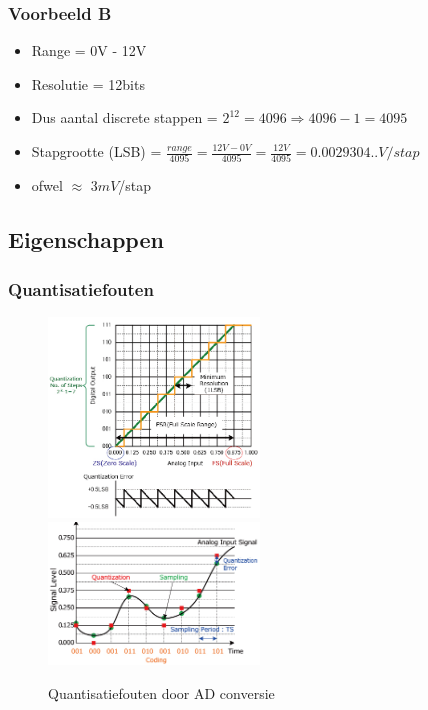 \documentclass{article}
\begin{document}
\subsubsection{Voorbeeld B}
\begin{itemize}
    \item Range = 0V - 12V
    \item Resolutie = 12bits
    \item Dus aantal discrete stappen = $2^{12} = 4096 \Rightarrow 4096 - 1 = 4095$
    \item Stapgrootte (LSB) = $\frac{range}{4095} = \frac{12V - 0V}{4095} = \frac{12V}{4095} = 0.0029304..V / stap$
    \item ofwel $\approx$ $3mV$/stap
\end{itemize}

\subsection{Eigenschappen}

\subsubsection{Quantisatiefouten}

\begin{figure}[H]
    \centering
    \centerline{
        \includegraphics[width=0.5\textwidth]{Screenshot_20200224_120800.jpg}
        \includegraphics[width=0.5\textwidth]{Screenshot_20200224_120900.jpg}    
    }
    \caption{Quantisatiefouten door AD conversie}
\end{figure}
\end{document}
